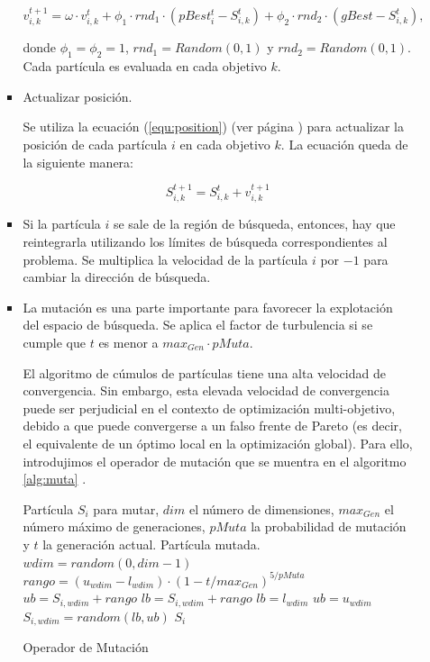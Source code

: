 \begin{enumerate}
\begin{enumerate}
\begin{itemize}
       \[v^{t+1}_{i,k} = \omega \cdot v^t_{i,k} + \phi_1 \cdot rnd_1 \cdot \left(pBest^t_i - S^t_{i,k} \right) 
					    + \phi_2 \cdot rnd_2 \cdot \left(gBest - S^t_{i,k} \right),\]

      donde $\phi_1 = \phi_2 = 1$, $rnd_1 = Random(0, 1)$ y $rnd_2 = Random(0, 1)$. Cada part\'icula es evaluada 
      en cada objetivo $k$.

      \item Actualizar posici\'on. 

      Se utiliza la ecuaci\'on (\ref{equ:position}) (ver p\'agina \pageref{equ:position})
      para actualizar la posici\'on de cada part\'icula $i$ en cada objetivo $k$. La ecuaci\'on queda de la siguiente 
      manera:

      \[S^{t+1}_{i,k}=S^{t}_{i,k}+v^{t+1}_{i,k}\]

      \item Si la part\'icula $i$ se sale de la regi\'on de b\'usqueda, entonces, hay que reintegrarla utilizando los 
      l\'imites de b\'usqueda correspondientes al problema. Se multiplica la velocidad de la part\'icula $i$ por $-1$ 
      para cambiar la direcci\'on de b\'usqueda.  

      \item La mutaci\'on es una parte importante para favorecer la explotaci\'on del espacio de b\'usqueda.
      Se aplica el factor de turbulencia si se cumple que $t$ es menor a $max_{Gen} \cdot pMuta$.

    El algoritmo de c\'umulos de part\'iculas tiene una alta velocidad de convergencia. Sin embargo, esta elevada
    velocidad de convergencia puede ser perjudicial en el contexto de optimizaci\'on multi-objetivo, debido
    a que puede convergerse a un falso frente de Pareto (es decir, el equivalente de un \'optimo local en la 
    optimizaci\'on global). Para ello, introdujimos el operador de mutaci\'on que se muentra en el algoritmo \ref{alg:muta} 
    \cite{Coello04}.

    \begin{algorithm}
      \begin{algorithmic}[1]			
	\REQUIRE  Part\'icula $S_i$ para mutar, $dim$ el n\'umero de dimensiones, $max_{Gen}$ el n\'umero m\'aximo de generaciones,
	      $pMuta$ la probabilidad de mutaci\'on y $t$ la generaci\'on actual.
	\ENSURE Part\'icula \DIFdelbegin {}\DIFdelend \DIFaddbegin {}\DIFaddend mutada.
	  \STATE $wdim = random(0, dim-1)$
	  \STATE $rango = \left(u_{wdim} - l_{wdim}\right)\cdot \left(1 - t/max_{Gen} \right)^{5/pMuta}$
	  \STATE $ub = S_{i,wdim} + rango$
	  \STATE $lb = S_{i,wdim} + rango$
	    \STATE $lb = l_{wdim}$
	  \ENDIF
	    \STATE $ub = u_{wdim}$
	  \ENDIF
	  \STATE $S_{i,wdim} = random\left(lb,ub\right)$
	\ENDIF	
	\RETURN $S_i$
  \end{algorithmic}
  \caption{Operador de Mutaci\'on}
  \label{alg:muta}
  \end{algorithm}


\end{itemize}
\end{enumerate}
\end{enumerate}
